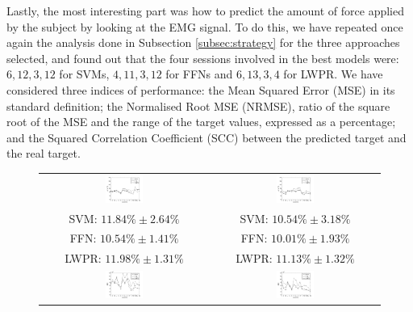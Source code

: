 Lastly, the most interesting part was how to predict the amount of
force applied by the subject by looking at the EMG signal. To do this,
we have repeated once again the analysis done in Subsection
\ref{subsec:strategy} for the three approaches selected, and found out
that the four sessions involved in the best models were: $6,12,3,12$
for SVMs, $4,11,3,12$ for FFNs and $6,13,3,4$ for LWPR. We have
considered three indices of performance: the Mean Squared Error (MSE)
in its standard definition; the Normalised Root MSE (NRMSE), ratio of
the square root of the MSE and the range of the target values,
expressed as a percentage; and the Squared Correlation Coefficient
(SCC) between the predicted target and the real target.

\begin{figure}[!ht] \centering
  \begin{tabular}{cc}
    \includegraphics[width=0.23\textwidth]{figs/fig_err_regr_resCrossBestOnDay1.png} &
    \includegraphics[width=0.23\textwidth]{figs/fig_err_regr_resCrossBestOnDay2.png} \\
     SVM: $11.84\% \pm 2.64\%$ &  SVM: $10.54\% \pm 3.18\%$ \\
     FFN: $10.54\% \pm 1.41\%$ &  FFN: $10.01\% \pm 1.93\%$ \\
    LWPR: $11.98\% \pm 1.31\%$ & LWPR: $11.13\% \pm 1.32\%$ \\
    \includegraphics[width=0.23\textwidth]{figs/fig_MSE_regr_resCrossBestOnDay1.png} &
    \includegraphics[width=0.23\textwidth]{figs/fig_MSE_regr_resCrossBestOnDay2.png} \\

\end{tabular}
\end{figure}

